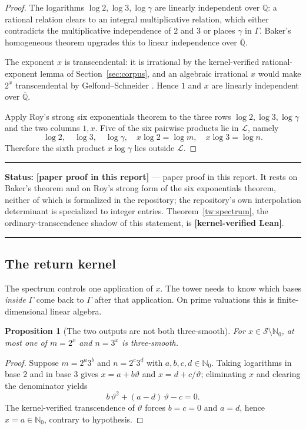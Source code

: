 \documentclass[11pt,oneside]{article}
\newtheorem{proposition}[theorem]{Proposition}
\theoremstyle{definition}
\theoremstyle{remark}
\newcommand{\Nzero}{\mathbb N_0}
\newcommand{\Q}{\mathbb Q}
\newcommand{\Abar}{\overline{\mathbb Q}}
\newcommand{\thetaq}{\vartheta}
\newcommand{\Sol}{\mathcal S}
\newcommand{\LL}{\mathcal L}
\newcommand{\GammaSat}{\Gamma}
\newcommand{\statuslean}{\textcolor{leanblue}{\textbf{[kernel-verified Lean]}}}
\newcommand{\statusnew}{\textcolor{newgreen}{\textbf{[paper proof in this report]}}}
\newenvironment{statusbox}[1]
{\begin{center}\begin{minipage}{0.94\textwidth}\raggedright\hbadness=10000\hrule
\vspace{0.45em}\textbf{Status:} #1\par\vspace{0.35em}}
{\vspace{0.35em}\hrule\end{minipage}\end{center}}
\begin{document}
\begin{proof}
The logarithms $\log2,\log3,\log\gamma$ are linearly independent over $\Q$: a rational
relation clears to an integral multiplicative relation, which either contradicts the
multiplicative independence of $2$ and $3$ or places $\gamma$ in $\GammaSat$.  Baker's
homogeneous theorem \cite{Baker1975} upgrades this to linear independence over $\Abar$.

The exponent $x$ is transcendental: it is irrational by the kernel-verified rational-exponent
lemma of Section~\ref{sec:corpus}, and an algebraic irrational $x$ would make $2^x$
transcendental by Gelfond--Schneider \cite{Schneider1957}.  Hence $1$ and $x$ are linearly
independent over $\Abar$.

Apply Roy's strong six exponentials theorem \cite{Roy1992,Waldschmidt2005} to the three rows
$\log2,\log3,\log\gamma$ and the two columns $1,x$.  Five of the six pairwise products lie in
$\LL$, namely
\[
 \log2,\quad\log3,\quad\log\gamma,\quad x\log2=\log m,\quad x\log3=\log n .
\]
Therefore the sixth product $x\log\gamma$ lies outside $\LL$.
\end{proof}

\begin{statusbox}{\statusnew{} --- paper proof in this report.  It rests on Baker's theorem
and on Roy's strong form of the six exponentials theorem, neither of which is formalized in
the repository; the repository's own interpolation determinant is specialized to integer
entries.  Theorem~\ref{tw:spectrum}, the ordinary-transcendence shadow of this statement, is
\statuslean{}.}
\end{statusbox}

\subsection{The return kernel}

The spectrum controls one application of $x$.  The tower needs to know which bases
\emph{inside} $\GammaSat$ come back to $\GammaSat$ after that application.  On prime
valuations this is finite-dimensional linear algebra.

\begin{proposition}[The two outputs are not both three-smooth]
\label{tw:not-both-smooth}
For $x\in\Sol\setminus\Nzero$, at most one of $m=2^x$ and $n=3^x$ is three-smooth.
\end{proposition}

\begin{proof}
Suppose $m=2^a3^b$ and $n=2^c3^d$ with $a,b,c,d\in\Nzero$.  Taking logarithms in base $2$ and
in base $3$ gives $x=a+b\thetaq$ and $x=d+c/\thetaq$; eliminating $x$ and clearing the
denominator yields
\begin{equation}
 b\,\thetaq^2+(a-d)\,\thetaq-c=0 .
 \label{tw:eq-quadratic}
\end{equation}
The kernel-verified transcendence of $\thetaq$ forces $b=c=0$ and $a=d$, hence $x=a\in\Nzero$,
contrary to hypothesis.
\end{proof}
\end{document}
